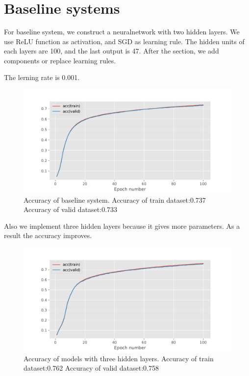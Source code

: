 \documentclass{article}
\begin{document}
\section{Baseline systems}
For baseline system, we construct a neuralnetwork with two hidden layers. We use ReLU function as activation, and SGD as learning rule. The hidden units of each layers are 100, and the last output is 47.
After the section, we add components or replace learning rules.

The lerning rate is 0.001.
\begin{figure}[h]
\vskip 5mm
\begin{center}
\centerline{\includegraphics[width=\columnwidth]{a.pdf}}
\caption{Accuracy of baseline system.
Accuracy of train dataset:0.737
Accuracy of valid dataset:0.733
}
\end{center}
\vskip -5mm
\end{figure}

Also we implement three hidden layers because it gives more parameters. As a result the accuracy improves.
\begin{figure}[h]
\vskip 5mm
\begin{center}
\centerline{\includegraphics[width=\columnwidth]{b.pdf}}
\caption{Accuracy of models with three hidden layers.
Accuracy of train dataset:0.762
Accuracy of valid dataset:0.758
}
\end{center}
\vskip -5mm
\end{figure}
\end{document}
